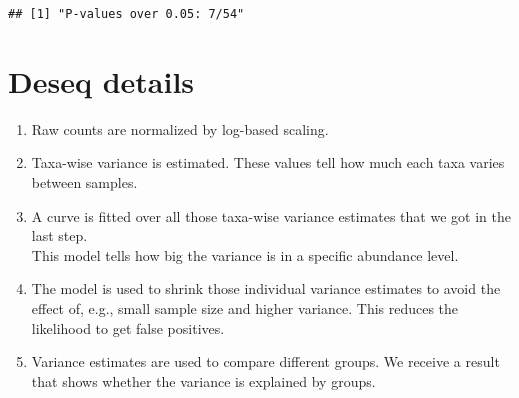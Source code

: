 \documentclass[
]{book}
\providecommand{\tightlist}{%
  \setlength{\itemsep}{0pt}\setlength{\parskip}{0pt}}
\begin{document}
\begin{verbatim}
## [1] "P-values over 0.05: 7/54"
\end{verbatim}

\hypertarget{deseq-details}{%
\section{Deseq details}\label{deseq-details}}

\begin{enumerate}
\def\labelenumi{\arabic{enumi}.}
\tightlist
\item
  Raw counts are normalized by log-based scaling.\\
\item
  Taxa-wise variance is estimated. These values tell how much each taxa varies between samples.\\
\item
  A curve is fitted over all those taxa-wise variance estimates that we got in the last step.\\
  This model tells how big the variance is in a specific abundance level.
\item
  The model is used to shrink those individual variance estimates to avoid the effect of,
  e.g., small sample size and higher variance. This reduces the likelihood to get
  false positives.\\
\item
  Variance estimates are used to compare different groups. We receive a result that shows whether the variance is explained by groups.
\end{enumerate}
\end{document}
